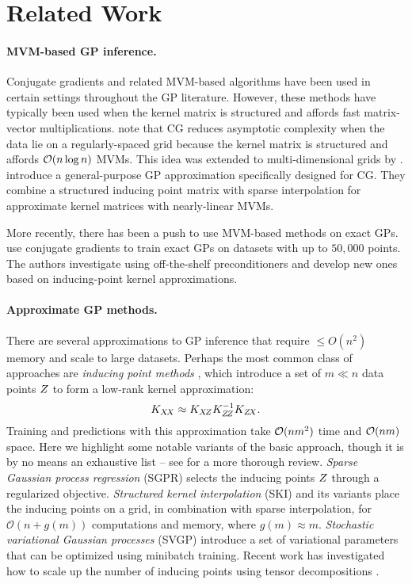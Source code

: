 \section{Related Work}

\paragraph{MVM-based GP inference.}
Conjugate gradients and related MVM-based algorithms \cite{ubaru2017fast,dong2017scalable} have been used in certain settings throughout the GP literature.
However, these methods have typically been used when the kernel matrix is structured and affords fast matrix-vector multiplications.
\citet{cunningham2008fast} note that CG reduces asymptotic complexity when the data lie on a regularly-spaced grid because the kernel matrix is structured and affords $\bigo{n \log n}$ MVMs.
This idea was extended to multi-dimensional grids by \citet{saatcci2012scalable}.
\citet{wilson2015kernel} introduce a general-purpose GP approximation specifically designed for CG.
They combine a structured inducing point matrix with sparse interpolation for approximate kernel matrices with nearly-linear MVMs.

More recently, there has been a push to use MVM-based methods on exact GPs.
\citet{cutajar2016preconditioning} use conjugate gradients to train exact GPs on datasets with up to $50,\!000$ points.
The authors investigate using off-the-shelf preconditioners and develop new ones based on inducing-point kernel approximations.

\paragraph{Approximate GP methods.}
There are several approximations to GP inference that require $\leq O(n^2)$ memory and scale to large datasets.
Perhaps the most common class of approaches are \emph{inducing point methods} \cite{quinonero2005unifying,snelson2006sparse}, which introduce a set of $m \ll n$ data points $Z$ to form a low-rank kernel approximation:
\[
  K_{X \! X} \approx K_{X \! Z} K_{Z \! Z}^{-1} K_{Z \! X}.
\]
Training and predictions with this approximation take $\bigo{n m^2}$ time and $\bigo{n m}$ space.
Here we highlight some notable variants of the basic approach, though it is by no means an exhaustive list -- see \cite{liu2018gaussian} for a more thorough review.
\emph{Sparse Gaussian process regression} (SGPR) \cite{titsias2009variational} selects the inducing points $Z$ through a regularized objective.
\emph{Structured kernel interpolation} (SKI) \cite{wilson2015kernel} and its variants \cite{gardner2018product} place the inducing points on a grid, in combination with sparse interpolation,
for $\mathcal{O}(n + g(m))$ computations and memory, where $g(m) \approx m$.
\emph{Stochastic variational Gaussian processes} (SVGP) \cite{hensman2013gaussian} introduce a set of variational parameters that can be optimized using minibatch training.
Recent work has investigated how to scale up the number of inducing points using tensor decompositions \cite{evans2018scalable,izmailov2018scalable}.
